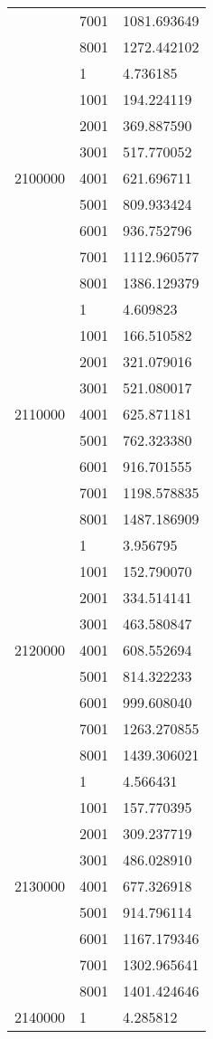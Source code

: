 \begin{table}[htb!]
\begin{tabular}{lll}
 & 7001 & 1081.693649 \\
 & 8001 & 1272.442102 \\
\multirow[c]{9}{*}{2100000} & 1 & 4.736185 \\
 & 1001 & 194.224119 \\
 & 2001 & 369.887590 \\
 & 3001 & 517.770052 \\
 & 4001 & 621.696711 \\
 & 5001 & 809.933424 \\
 & 6001 & 936.752796 \\
 & 7001 & 1112.960577 \\
 & 8001 & 1386.129379 \\
\multirow[c]{9}{*}{2110000} & 1 & 4.609823 \\
 & 1001 & 166.510582 \\
 & 2001 & 321.079016 \\
 & 3001 & 521.080017 \\
 & 4001 & 625.871181 \\
 & 5001 & 762.323380 \\
 & 6001 & 916.701555 \\
 & 7001 & 1198.578835 \\
 & 8001 & 1487.186909 \\
\multirow[c]{9}{*}{2120000} & 1 & 3.956795 \\
 & 1001 & 152.790070 \\
 & 2001 & 334.514141 \\
 & 3001 & 463.580847 \\
 & 4001 & 608.552694 \\
 & 5001 & 814.322233 \\
 & 6001 & 999.608040 \\
 & 7001 & 1263.270855 \\
 & 8001 & 1439.306021 \\
\multirow[c]{9}{*}{2130000} & 1 & 4.566431 \\
 & 1001 & 157.770395 \\
 & 2001 & 309.237719 \\
 & 3001 & 486.028910 \\
 & 4001 & 677.326918 \\
 & 5001 & 914.796114 \\
 & 6001 & 1167.179346 \\
 & 7001 & 1302.965641 \\
 & 8001 & 1401.424646 \\
\multirow[c]{9}{*}{2140000} & 1 & 4.285812 \\

\end{tabular}
\end{table}
